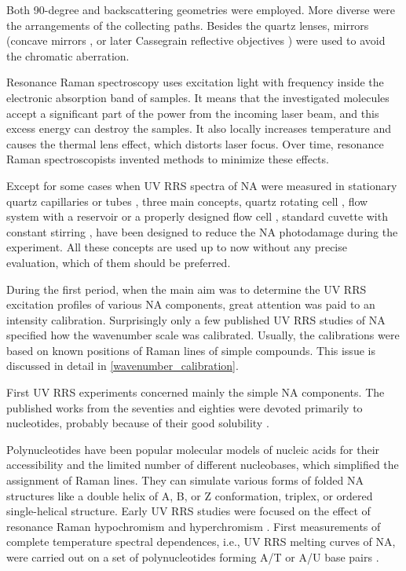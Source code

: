 Both 90-degree and backscattering geometries were employed.
More diverse were the arrangements of the collecting paths.
Besides the quartz lenses, mirrors (concave mirrors
\cite{Blazej1977},
or later Cassegrain reflective objectives
\cite{%
	Toyama1991%
})
were used to avoid the chromatic aberration.

Resonance Raman spectroscopy uses excitation light with frequency inside the
electronic absorption band of samples.
It means that the investigated molecules accept a significant part of the power
from the incoming laser beam, and this excess energy can destroy the samples.
It also locally increases temperature and causes the thermal lens effect, which
distorts laser focus.
Over time, resonance Raman spectroscopists invented methods to minimize these
effects.

Except for some cases when UV RRS spectra of NA were measured in stationary
quartz capillaries or tubes
\parencite{%
	Blazej1977%
},
three main concepts, quartz rotating cell
\parencite{%
	Kiefer1971,%
	Kiefer1971a,%
},
flow system with a reservoir
\parencite{Ziegler1981}
or a properly designed flow cell
\parencite{Blazej1980},
standard cuvette with constant stirring
\parencite{Jolles1984},
have been designed to reduce the NA photodamage during the
experiment.
All these concepts are used up to now without any precise evaluation, which of
them should be preferred.

During the first period, when the main aim was to determine the UV RRS
excitation profiles of various NA components, great attention was paid to an
intensity calibration.
Surprisingly only a few published UV RRS studies of NA specified how the
wavenumber scale was calibrated.
Usually, the calibrations were based on known positions of Raman lines of
simple compounds.
This issue is discussed in detail in
\cref{wavenumber_calibration}.

First UV RRS experiments concerned mainly the simple NA components.
The published works from the seventies and eighties were devoted primarily to
nucleotides, probably because of their good solubility
\parencite{Tsuboi1974}.

Polynucleotides have been popular molecular models of nucleic acids for their
accessibility and the limited number of different nucleobases, which simplified
the assignment of Raman lines.
They can simulate various forms of folded NA structures like a double
helix of A, B, or Z conformation, triplex, or ordered single-helical structure.
Early UV RRS studies were focused on the effect of resonance Raman
hypochromism
\parencite{Pezolet1975}
and hyperchromism
\parencite{Chinsky1980}.
First measurements of complete temperature spectral dependences, i.e., UV RRS
melting curves of NA, were carried out on a set of polynucleotides forming A/T
or A/U base pairs
\parencite{Jolles1985}.

